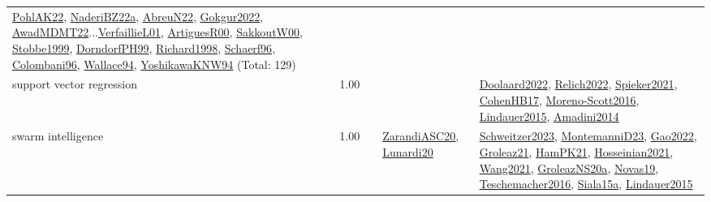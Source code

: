 {\begin{longtable}{p{3cm}r>{\raggedright\arraybackslash}p{6cm}>{\raggedright\arraybackslash}p{6cm}>{\raggedright\arraybackslash}p{8cm}}
\hyperref[detail:PohlAK22]{PohlAK22}, \hyperref[detail:NaderiBZ22a]{NaderiBZ22a}, \hyperref[detail:AbreuN22]{AbreuN22}, \hyperref[detail:Gokgur2022]{Gokgur2022}, \hyperref[detail:AwadMDMT22]{AwadMDMT22}...\hyperref[detail:VerfaillieL01]{VerfaillieL01}, \hyperref[detail:ArtiguesR00]{ArtiguesR00}, \hyperref[detail:SakkoutW00]{SakkoutW00}, \hyperref[detail:Stobbe1999]{Stobbe1999}, \hyperref[detail:DorndorfPH99]{DorndorfPH99}, \hyperref[detail:Richard1998]{Richard1998}, \hyperref[detail:Schaerf96]{Schaerf96}, \hyperref[detail:Colombani96]{Colombani96}, \hyperref[detail:Wallace94]{Wallace94}, \hyperref[detail:YoshikawaKNW94]{YoshikawaKNW94} (Total: 129)\\
\index{support vector regression}\index{Algorithms!support vector regression}support vector regression &  1.00 &  &  & \hyperref[detail:Doolaard2022]{Doolaard2022}, \hyperref[detail:Relich2022]{Relich2022}, \hyperref[detail:Spieker2021]{Spieker2021}, \hyperref[detail:CohenHB17]{CohenHB17}, \hyperref[detail:Moreno-Scott2016]{Moreno-Scott2016}, \hyperref[detail:Lindauer2015]{Lindauer2015}, \hyperref[detail:Amadini2014]{Amadini2014}\\
\index{swarm intelligence}\index{Algorithms!swarm intelligence}swarm intelligence &  1.00 &  & \hyperref[detail:ZarandiASC20]{ZarandiASC20}, \hyperref[detail:Lunardi20]{Lunardi20} & \hyperref[detail:Schweitzer2023]{Schweitzer2023}, \hyperref[detail:MontemanniD23]{MontemanniD23}, \hyperref[detail:Gao2022]{Gao2022}, \hyperref[detail:Groleaz21]{Groleaz21}, \hyperref[detail:HamPK21]{HamPK21}, \hyperref[detail:Hosseinian2021]{Hosseinian2021}, \hyperref[detail:Wang2021]{Wang2021}, \hyperref[detail:GroleazNS20a]{GroleazNS20a}, \hyperref[detail:Novas19]{Novas19}, \hyperref[detail:Teschemacher2016]{Teschemacher2016}, \hyperref[detail:Siala15a]{Siala15a}, \hyperref[detail:Lindauer2015]{Lindauer2015}\\

\end{longtable}}
